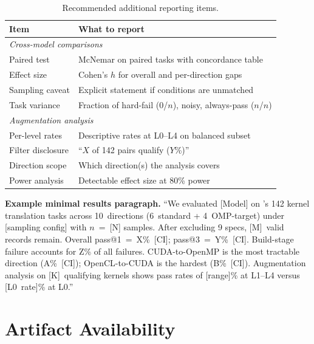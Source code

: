 \begin{table}[htbp]
\centering
\caption{Recommended additional reporting items.}
\label{tab:reporting-recommended}
\small
\begin{tabularx}{\columnwidth}{@{}p{2.3cm}X@{}}
\toprule
Item & What to report \\
\midrule
\multicolumn{2}{l}{\textit{Cross-model comparisons}} \\
Paired test & McNemar on paired tasks with concordance table \\
Effect size & Cohen's $h$ for overall and per-direction gaps \\
Sampling caveat & Explicit statement if conditions are unmatched \\
Task variance & Fraction of hard-fail (0/$n$), noisy, always-pass ($n$/$n$) \\
\midrule
\multicolumn{2}{l}{\textit{Augmentation analysis}} \\
Per-level rates & Descriptive rates at L0--L4 on balanced subset \\
Filter disclosure & ``$X$ of 142 pairs qualify ($Y$\%)'' \\
Direction scope & Which direction(s) the analysis covers \\
Power analysis & Detectable effect size at 80\% power \\
\bottomrule
\end{tabularx}
\end{table}

\textbf{Example minimal results paragraph.} ``We evaluated [Model] on
\parbench{}'s 142 kernel translation tasks across 10~directions (6~standard +
4~OMP-target) under [sampling config] with $n$~=~[N] samples. After excluding 9
\knownfail{} specs, [M]~valid records remain. Overall pass@1~=~X\%~[CI];
pass@3~=~Y\%~[CI]. Build-stage failure accounts for Z\% of all failures.
CUDA-to-OpenMP is the most tractable direction (A\%~[CI]); OpenCL-to-CUDA is
the hardest (B\%~[CI]). Augmentation analysis on [K]~qualifying kernels shows
pass rates of [range]\% at L1--L4 versus [L0~rate]\% at L0.''

\section{Artifact Availability}
\label{sec:artifact-availability}

